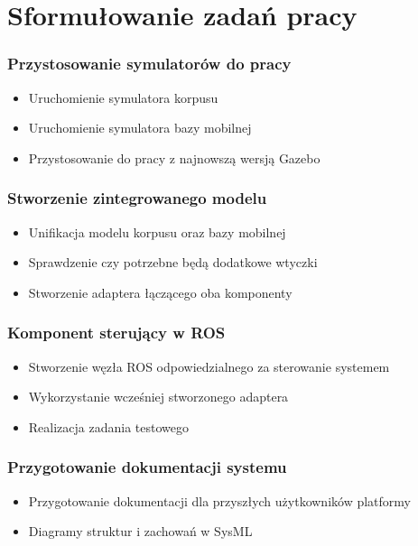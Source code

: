 \section{Sformułowanie zadań pracy}


\begin{frame}
	\frametitle{Przystosowanie symulatorów do pracy}
	\begin{itemize}
		\item Uruchomienie symulatora korpusu
		\item Uruchomienie symulatora bazy mobilnej
		\item Przystosowanie do pracy z najnowszą wersją Gazebo 
	\end{itemize}
\end{frame}


\begin{frame}
	\frametitle{Stworzenie zintegrowanego modelu}
	\begin{itemize}
		\item Unifikacja modelu korpusu oraz bazy mobilnej
		\item Sprawdzenie czy potrzebne będą dodatkowe wtyczki
		\item Stworzenie adaptera łączącego oba komponenty 
	\end{itemize}
\end{frame}


\begin{frame}
	\frametitle{Komponent sterujący w ROS}
	\begin{itemize}
		\item Stworzenie węzła ROS odpowiedzialnego za sterowanie systemem
		\item Wykorzystanie wcześniej stworzonego adaptera
		\item Realizacja zadania testowego
	\end{itemize}
\end{frame}


\begin{frame}
	\frametitle{Przygotowanie dokumentacji systemu}
	\begin{itemize}
		\item Przygotowanie dokumentacji dla przyszłych użytkowników platformy
		\item Diagramy struktur i zachowań w SysML
	\end{itemize}
\end{frame}

